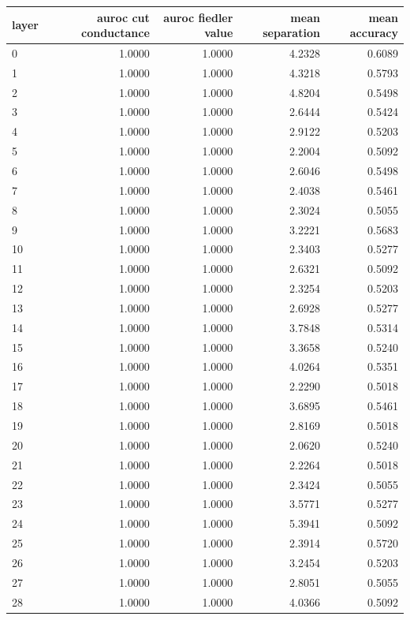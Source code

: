\documentclass[11pt,a4paper]{article}
\begin{document}
\begin{table}[htbp]
\centering
\small
\begin{tabular}{lrrrr}
\hline
layer & auroc cut conductance & auroc fiedler value & mean separation & mean accuracy \\
\hline
0 & 1.0000 & 1.0000 & 4.2328 & 0.6089 \\
1 & 1.0000 & 1.0000 & 4.3218 & 0.5793 \\
2 & 1.0000 & 1.0000 & 4.8204 & 0.5498 \\
3 & 1.0000 & 1.0000 & 2.6444 & 0.5424 \\
4 & 1.0000 & 1.0000 & 2.9122 & 0.5203 \\
5 & 1.0000 & 1.0000 & 2.2004 & 0.5092 \\
6 & 1.0000 & 1.0000 & 2.6046 & 0.5498 \\
7 & 1.0000 & 1.0000 & 2.4038 & 0.5461 \\
8 & 1.0000 & 1.0000 & 2.3024 & 0.5055 \\
9 & 1.0000 & 1.0000 & 3.2221 & 0.5683 \\
10 & 1.0000 & 1.0000 & 2.3403 & 0.5277 \\
11 & 1.0000 & 1.0000 & 2.6321 & 0.5092 \\
12 & 1.0000 & 1.0000 & 2.3254 & 0.5203 \\
13 & 1.0000 & 1.0000 & 2.6928 & 0.5277 \\
14 & 1.0000 & 1.0000 & 3.7848 & 0.5314 \\
15 & 1.0000 & 1.0000 & 3.3658 & 0.5240 \\
16 & 1.0000 & 1.0000 & 4.0264 & 0.5351 \\
17 & 1.0000 & 1.0000 & 2.2290 & 0.5018 \\
18 & 1.0000 & 1.0000 & 3.6895 & 0.5461 \\
19 & 1.0000 & 1.0000 & 2.8169 & 0.5018 \\
20 & 1.0000 & 1.0000 & 2.0620 & 0.5240 \\
21 & 1.0000 & 1.0000 & 2.2264 & 0.5018 \\
22 & 1.0000 & 1.0000 & 2.3424 & 0.5055 \\
23 & 1.0000 & 1.0000 & 3.5771 & 0.5277 \\
24 & 1.0000 & 1.0000 & 5.3941 & 0.5092 \\
25 & 1.0000 & 1.0000 & 2.3914 & 0.5720 \\
26 & 1.0000 & 1.0000 & 3.2454 & 0.5203 \\
27 & 1.0000 & 1.0000 & 2.8051 & 0.5055 \\
28 & 1.0000 & 1.0000 & 4.0366 & 0.5092 \\

\end{tabular}
\end{table}
\end{document}

